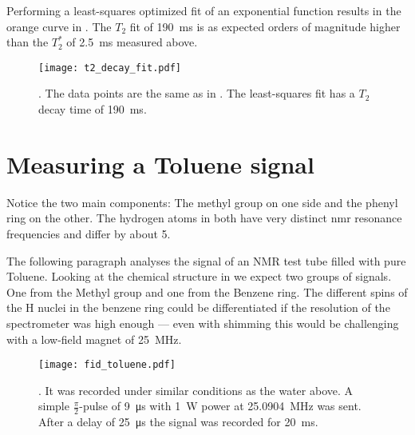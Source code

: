 Performing a least-squares optimized fit of an exponential function results in the orange curve in . The \(T_2\) fit of \qty{190}{\milli\second} is as expected orders of magnitude higher than the \(T_2^*\) of \qty{2.5}{\milli\second} measured above.

\begin{figure}[h!bt]
    \centering
    \texttt{[image: t2\_decay\_fit.pdf]}
    \caption{. The data points are the same as in . The least-squares fit has a \(T_2\) decay time of \qty{190}{\milli\second}.}
\end{figure}

\section{Measuring a Toluene signal}

\begin{marginfigure}
    \centering
    
    \caption{ Notice the two main components: The  methyl group on one side and the phenyl ring on the other. The hydrogen atoms in both have very distinct \acrshort{nmr} resonance frequencies and differ by about \qty{5}{\partspermillion}.}
\end{marginfigure}

The following paragraph analyses the signal of an NMR test tube filled with pure Toluene. Looking at the chemical structure in  we expect two groups of signals. One from the  Methyl group and one from the Benzene ring. The different spins of the H nuclei in the benzene ring could be differentiated if the resolution of the spectrometer was high enough --- even with shimming this would be challenging with a low-field magnet of \qty{25}{\mega\hertz}.

\begin{figure}[h!bt]
    \centering
    \texttt{[image: fid\_toluene.pdf]}
    \caption{. It was recorded under similar conditions as the water above. A simple \(\frac{\pi}{2}\)-pulse of \qty{9}{\micro\second} with \qty{1}{\watt} power at \qty{25.0904}{\mega\hertz} was sent. After a delay of \qty{25}{\micro\second} the signal was recorded for \qty{20}{\milli\second}.}
\end{figure}


